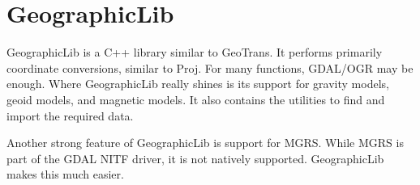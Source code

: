 %


\section*{GeographicLib}

GeographicLib is a C++ library similar to GeoTrans.  It performs primarily coordinate conversions,
similar to Proj.  For many functions, GDAL/OGR may be enough.  Where GeographicLib really shines is
its support for gravity models, geoid models, and magnetic models.  It also contains the utilities to 
find and import the required data.

Another strong feature of GeographicLib is support for MGRS.  While MGRS is part of the 
GDAL NITF driver, it is not natively supported.  GeographicLib makes this much easier.


